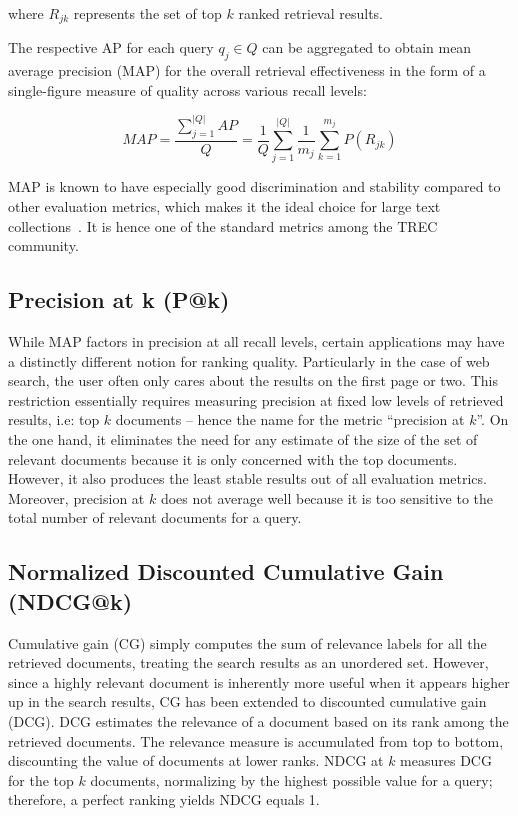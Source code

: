 where $ R_{jk} $ represents the set of top $ k $ ranked retrieval results.

The respective AP for each query $ q_{j} \in Q $ can be aggregated to obtain mean average precision (MAP) for the overall retrieval effectiveness in the form of a single-figure measure of quality across various recall levels:

\begin{equation}
MAP = \frac{\sum^{|Q|} _{j = 1} AP}{Q} = \frac{1}{Q} \sum^{|Q|} _{j = 1} \frac{1}{m_j} \sum^{m_j} _{k = 1} P(R_{jk})
\end{equation}


MAP is known to have especially good discrimination and stability compared to other evaluation metrics, which makes it the ideal choice for large text collections~\cite{manning2010introduction}.
It is hence one of the standard metrics among the TREC community.

\subsection{Precision at k (P@k)}

While MAP factors in precision at all recall levels, certain applications may have a distinctly different notion for ranking quality.
Particularly in the case of web search, the user often only cares about the results on the first page or two.
This restriction essentially requires measuring precision at fixed low levels of retrieved results, i.e: top $ k $ documents -- hence the name for the metric ``precision at $ k $''.
On the one hand, it eliminates the need for any estimate of the size of the set of relevant documents because it is only concerned with the top documents.
However, it also produces the least stable results out of all evaluation metrics.
Moreover, precision at $ k $ does not average well because it is too sensitive to the total number of relevant documents for a query.

\subsection{Normalized Discounted Cumulative Gain (NDCG@k)}

Cumulative gain (CG) simply computes the sum of relevance labels for all the retrieved documents, treating the search results as an unordered set.
However, since a highly relevant document is inherently more useful when it appears higher up in the search results, CG has been extended to discounted cumulative gain (DCG).
DCG estimates the relevance of a document based on its rank among the retrieved documents.
The relevance measure is accumulated from top to bottom, discounting the value of documents at lower ranks.
NDCG at $ k $ measures DCG for the top $ k $ documents, normalizing by the highest possible value for a query; therefore, a perfect ranking yields NDCG equals 1.


